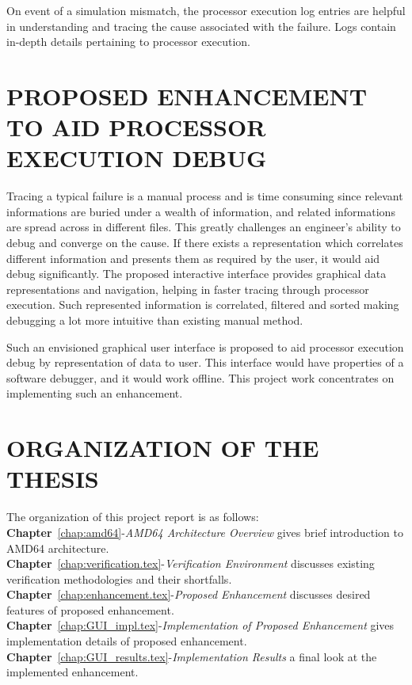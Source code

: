 On event of a simulation mismatch, the processor execution log entries are helpful in understanding and tracing the cause associated with the failure. Logs contain in-depth details pertaining to processor execution. 

\section{PROPOSED ENHANCEMENT TO AID PROCESSOR EXECUTION DEBUG}
Tracing a typical failure is a manual process and is time consuming since relevant informations are buried under a wealth of information, and related informations are spread across in different files. This greatly challenges an engineer's ability to debug and converge on the cause. If there exists a representation which correlates different information and presents them as required by the user, it would aid debug significantly. The proposed interactive interface provides graphical data representations and navigation, helping in faster tracing through processor execution. Such represented information is correlated, filtered and sorted making debugging a lot more intuitive than existing manual method.


Such an envisioned graphical user interface is proposed to aid processor execution debug by representation of data to user. This interface would have properties of a software debugger, and it would work offline. This project work concentrates on implementing such an enhancement.

 


\section{ORGANIZATION OF THE THESIS}
The organization of this project report is as follows:\\
\noindent 
{\bf Chapter}~\ref{chap:amd64}-{\it AMD64 Architecture Overview} gives brief introduction to AMD64 architecture.\\
{\bf Chapter}~\ref{chap:verification.tex}-{\it Verification Environment} discusses existing verification methodologies and their shortfalls.\\
{\bf Chapter}~\ref{chap:enhancement.tex}-{\it Proposed Enhancement} discusses desired features of proposed enhancement.\\
{\bf Chapter}~\ref{chap:GUI_impl.tex}-{\it Implementation of Proposed Enhancement} gives implementation details of proposed enhancement.\\
{\bf Chapter}~\ref{chap:GUI_results.tex}-{\it Implementation Results} a final look at the implemented enhancement.\\

